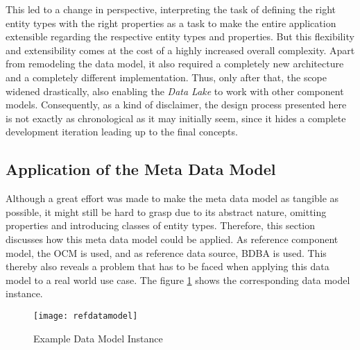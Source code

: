 This led to a change in perspective, interpreting the task of defining the right entity types with the right properties as a task to make the entire application extensible regarding the respective entity types and properties. But this flexibility and extensibility comes at the cost of a highly increased overall complexity. Apart from remodeling the data model, it also required a completely new architecture and a completely different implementation. Thus, only after that, the scope widened drastically, also enabling the \emph{Data Lake} to work with other component models. Consequently, as a kind of disclaimer, the design process presented here is not exactly as chronological as it may initially seem, since it hides a complete development iteration leading up to the final concepts.

\subsection{Application of the Meta Data Model} \label{sec:Application of the Data Model}
Although a great effort was made to make the meta data model as tangible as possible, it might still be hard to grasp due to its abstract nature, omitting properties and introducing classes of entity types. Therefore, this section discusses how this meta data model could be applied. As reference component model, the OCM is used, and as reference data source, BDBA is used. This thereby also reveals a problem that has to be faced when applying this data model to a real world use case. The figure \ref{fig:RefDataModel} shows the corresponding data model instance.\par

\begin{figure}[H]
	\centering
	\texttt{[image: refdatamodel]}
	\caption[Data Model Instance]{Example Data Model Instance }
	\label{fig:RefDataModel}
\end{figure}

